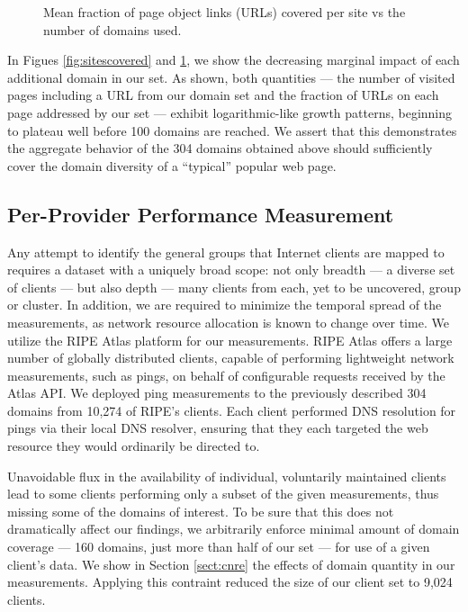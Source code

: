 \begin{figure}
    \caption{Mean fraction of page object links (URLs) covered per site vs the
    number of domains used.
    }
    \label{fig:linkscovered}
\end{figure}

In Figues \ref{fig:sitescovered} and \ref{fig:linkscovered}, we show the
decreasing marginal impact of each additional domain in our set. As shown, both
quantities --- the number of visited pages including a URL from our domain set and the
fraction of URLs on each page addressed by our set --- exhibit logarithmic-like
growth patterns, beginning to plateau well before 100 domains are reached. We
assert that this demonstrates the aggregate behavior of the 304 domains obtained above
should sufficiently cover the domain diversity of a ``typical'' popular web page. 


\subsection{Per-Provider Performance Measurement}

Any attempt to identify the general groups that Internet clients are mapped to
requires a dataset with a uniquely broad scope: not only breadth --- a diverse
set of clients --- but also depth --- many clients from each, yet to be
uncovered, group or cluster. In addition, we are required to minimize the
temporal spread of the measurements, as network resource allocation is known to
change over time. We utilize the RIPE Atlas platform \cite{ripe-atlas} for our measurements.
RIPE Atlas offers a large number of globally distributed clients, capable of
performing lightweight network measurements, such as pings, on behalf of
configurable requests received by the Atlas API. We deployed ping measurements
to the previously described 304 domains from 10,274 of RIPE's clients. Each
client performed DNS resolution for pings via their local DNS resolver, ensuring
that they each targeted the web resource they would ordinarily be directed to.

Unavoidable flux in the availability of individual, voluntarily maintained
clients lead to some clients performing only a subset of the given
measurements, thus missing some of the domains of interest. To be sure that this
does not dramatically affect our findings, we arbitrarily enforce minimal amount
of domain coverage --- 160 domains, just more than half of our set --- for use
of a given client's data. We show in Section \ref{sect:cnre} the effects of domain quantity
in our measurements. Applying this contraint reduced the size of our client
set to 9,024 clients.  

